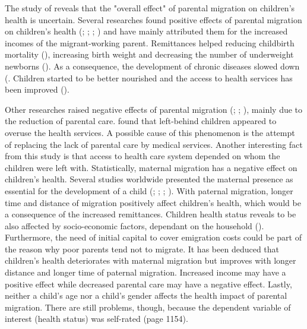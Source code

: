 
The study of \textcite{guo2017effect} reveals that the "overall effect" of parental migration on children’s health is uncertain. Several researches found positive effects of parental migration on children’s health (\cite{mundial2006development}; \cite{acosta2007impact}; \cite{anton2010impact}; \cite{stillman2012impact}) and have mainly attributed them for the increased incomes of the migrant-working parent. Remittances helped reducing childbirth mortality (\cite{hildebrandt2005effects}), increasing birth weight and decreasing the number of underweight newborns (\cite{frank2002other}). As a consequence, the development of chronic diseases slowed down (\cite{case2002economic}. Children started to be better nourished and the access to health services has been improved (\cite{nobles2006contribution}).

Other researches raised negative effects of parental  migration (\cite{amato1999nonresident}; \cite{kanaiaupuni2000reframing}; \cite{fernandez1998fathers}), mainly due to the reduction of parental care. \textcite{song2009health} found that left-behind children appeared to overuse the health services. A possible cause of this phenomenon is the attempt of replacing the lack of parental care by medical services. Another interesting fact from this study is that access to health care system depended on whom the children were left with. Statistically, maternal migration has a negative effect on children’s health. Several studies worldwide presented the maternal presence as essential for the development of a child (\cite{cortes2015feminization}; \cite{jampaklay2006parental}; \cite{macours2010seasonal}; \cite{thomas1994like}). With paternal migration, longer time and distance of migration positively affect children’s health, which would be a consequence of the increased remittances. Children health status reveals to be also affected by socio-economic factors, dependant on the household (\cite{behrman1996impact}). Furthermore, the need of initial capital to cover emigration costs could be part of the reason why poor parents tend not to migrate. It has been deduced that children’s health deteriorates with maternal migration but improves with longer distance and longer time of paternal migration. Increased income may have a positive effect while decreased parental care may have a negative effect. Lastly, neither a child’s age nor a child’s gender affects the health impact of parental migration. There are still problems, though, because the dependent variable of interest (health status) was self-rated (page 1154).

